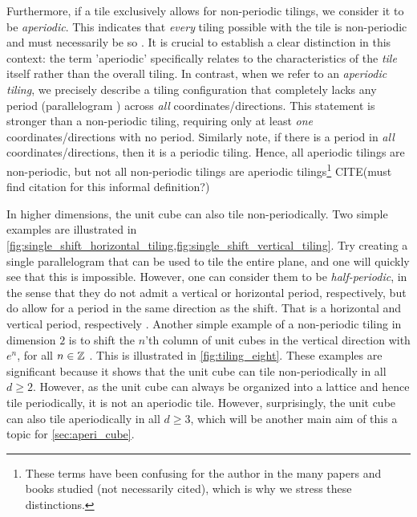 \documentclass[../thesis.tex]{subfiles}
\begin{document}
Furthermore, if a tile exclusively allows for non-periodic tilings, we consider it to be \emph{aperiodic}. This indicates that \emph{every} tiling possible with the tile is non-periodic and must necessarily be so \cite[p. 520]{grunbaumTilingsPatterns1987}. It is crucial to establish a clear distinction in this context: the term 'aperiodic' specifically relates to the characteristics of the \emph{tile} itself rather than the overall tiling. In contrast, when we refer to an \emph{aperiodic tiling}, we precisely describe a tiling configuration that completely lacks any period (parallelogram ) across \emph{all} coordinates/directions. This statement is stronger than a non-periodic tiling, requiring only at least \emph{one} coordinates/directions with no period. Similarly note, if there is a period in \emph{all} coordinates/directions, then it is a periodic tiling. Hence, all aperiodic tilings are non-periodic, but not all non-periodic tilings are aperiodic tilings\footnote[1]{These terms have been confusing for the author in the many papers and books studied (not necessarily cited), which is why we stress these distinctions.} CITE(must find citation for this informal definition?) %

In higher dimensions, the unit cube can also tile non-periodically. Two simple examples are illustrated in \cref{fig:single_shift_horizontal_tiling,fig:single_shift_vertical_tiling}. Try creating a single parallelogram that can be used to tile the entire plane, and one will quickly see that this is impossible. However, one can consider them to be \emph{half-periodic}, in the sense that they do not admit a vertical or horizontal period, respectively, but do allow for a period in the same direction as the shift. That is a horizontal and vertical period, respectively \cite{kolountzakisTilingsTranslation2010}. Another simple example of a non-periodic tiling in dimension $2$ is to shift the $n$'th column  of unit cubes in the vertical  direction with $e^n$, for all $n\in\mathbb{Z}$ \cite{liuUniformityNonUniformGabor2003}. This is illustrated in \cref{fig:tiling_eight}. These examples are significant because it shows that the unit cube can tile non-periodically in all $d\geq 2$. However, as the unit cube can always be organized into a lattice and hence tile periodically, it is not an aperiodic tile. However, surprisingly, the unit cube can also tile aperiodically in all $d\geq 3$, which will be another main aim of this  a topic for \cref{sec:aperi_cube}.
\end{document}
